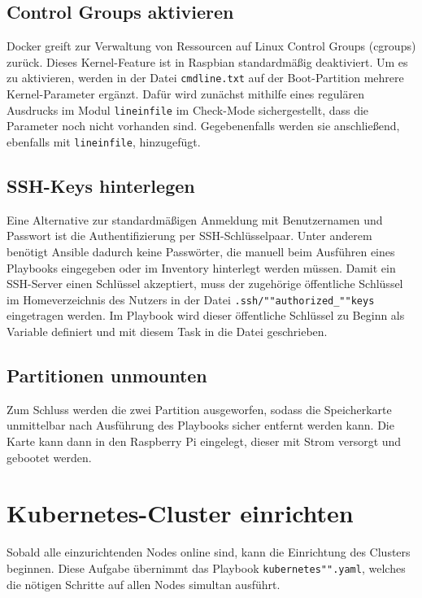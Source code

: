 \subsection{Control Groups aktivieren}\label{subsec:control-groups-aktivieren}

Docker greift zur Verwaltung von Ressourcen auf Linux Control Groups (cgroups) zurück.
Dieses Kernel-Feature ist in Raspbian standardmäßig deaktiviert.
Um es zu aktivieren, werden in der Datei \texttt{cmdline.txt} auf der Boot-Partition mehrere Kernel-Parameter ergänzt.
Dafür wird zunächst mithilfe eines regulären Ausdrucks im Modul \texttt{lineinfile} im Check-Mode sichergestellt, dass die Parameter noch nicht vorhanden sind.
Gegebenenfalls werden sie anschließend, ebenfalls mit \texttt{lineinfile}, hinzugefügt.

\subsection{SSH-Keys hinterlegen}\label{subsec:ssh-keys-hinterlegen}

Eine Alternative zur standardmäßigen Anmeldung mit Benutzernamen und Passwort ist die Authentifizierung per SSH-Schlüsselpaar.
Unter anderem benötigt Ansible dadurch keine Passwörter, die manuell beim Ausführen eines Playbooks eingegeben oder im Inventory hinterlegt werden müssen.
Damit ein SSH-Server einen Schlüssel akzeptiert, muss der zugehörige öffentliche Schlüssel im Homeverzeichnis des Nutzers in der Datei \texttt{.ssh/""authorized\_""keys} eingetragen werden.
Im Playbook wird dieser öffentliche Schlüssel zu Beginn als Variable definiert und mit diesem Task in die Datei geschrieben.

\subsection{Partitionen unmounten}\label{subsec:partitionen-unmounten}

Zum Schluss werden die zwei Partition ausgeworfen, sodass die Speicherkarte unmittelbar nach Ausführung des Playbooks sicher entfernt werden kann.
Die Karte kann dann in den Raspberry Pi eingelegt, dieser mit Strom versorgt und gebootet werden.

\section{Kubernetes-Cluster einrichten}

Sobald alle einzurichtenden Nodes online sind, kann die Einrichtung des Clusters beginnen.
Diese Aufgabe übernimmt das Playbook \texttt{kubernetes"".yaml}, welches die nötigen Schritte auf allen Nodes simultan ausführt.

